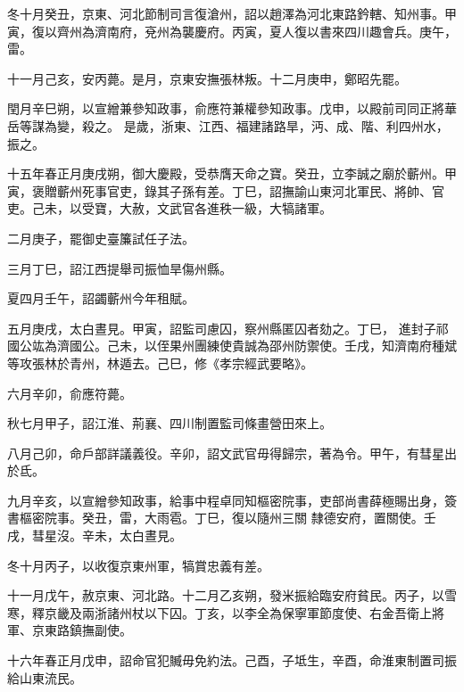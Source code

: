\begin{pinyinscope}
 冬十月癸丑，京東、河北節制司言復滄州，詔以趙澤為河北東路鈐轄、知州事。甲寅，復以齊州為濟南府，兗州為襲慶府。丙寅，夏人復以書來四川趣會兵。庚午，雷。



 十一月己亥，安丙薨。是月，京東安撫張林叛。十二月庚申，鄭昭先罷。



 閏月辛巳朔，以宣繒兼參知政事，俞應符兼權參知政事。戊申，以殿前司同正將華岳等謀為變，殺之。
 是歲，浙東、江西、福建諸路旱，沔、成、階、利四州水，振之。



 十五年春正月庚戌朔，御大慶殿，受恭膺天命之寶。癸丑，立李誠之廟於蘄州。甲寅，褒贈蘄州死事官吏，錄其子孫有差。丁巳，詔撫諭山東河北軍民、將帥、官吏。己未，以受寶，大赦，文武官各進秩一級，大犒諸軍。



 二月庚子，罷御史臺簾試任子法。



 三月丁巳，詔江西提舉司振恤旱傷州縣。



 夏四月壬午，詔蠲蘄州今年租賦。



 五月庚戌，太白晝見。甲寅，詔監司慮囚，察州縣匿囚者劾之。丁巳，
 進封子祁國公竑為濟國公。己未，以侄果州團練使貴誠為邵州防禦使。壬戌，知濟南府種斌等攻張林於青州，林遁去。己巳，修《孝宗經武要略》。



 六月辛卯，俞應符薨。



 秋七月甲子，詔江淮、荊襄、四川制置監司條畫營田來上。



 八月己卯，命戶部詳議義役。辛卯，詔文武官毋得歸宗，著為令。甲午，有彗星出於氐。



 九月辛亥，以宣繒參知政事，給事中程卓同知樞密院事，吏部尚書薛極賜出身，簽書樞密院事。癸丑，雷，大雨雹。丁巳，復以隨州三關
 隸德安府，置關使。壬戌，彗星沒。辛未，太白晝見。



 冬十月丙子，以收復京東州軍，犒賞忠義有差。



 十一月戊午，赦京東、河北路。十二月乙亥朔，發米振給臨安府貧民。丙子，以雪寒，釋京畿及兩浙諸州杖以下囚。丁亥，以李全為保寧軍節度使、右金吾衛上將軍、京東路鎮撫副使。



 十六年春正月戊申，詔命官犯贓毋免約法。己酉，子坻生，辛酉，命淮東制置司振給山東流民。




\end{pinyinscope}
